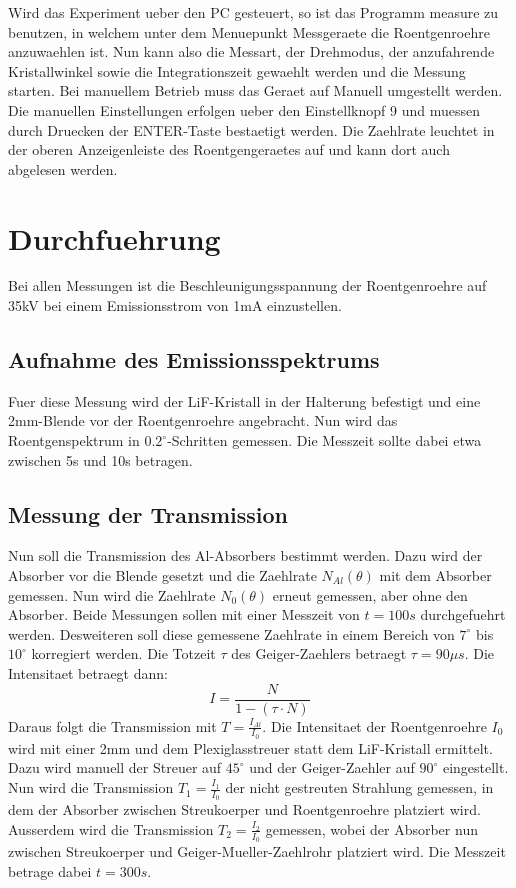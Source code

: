 \noindent Wird das Experiment ueber den PC gesteuert, so ist das Programm measure zu benutzen, in welchem unter dem Menuepunkt Messgeraete die Roentgenroehre anzuwaehlen ist. Nun kann also die Messart, der Drehmodus, der anzufahrende
Kristallwinkel sowie die Integrationszeit gewaehlt werden und die Messung starten. Bei
manuellem Betrieb muss das Geraet auf Manuell umgestellt werden. Die manuellen Einstellungen erfolgen ueber den Einstellknopf
9 und muessen durch Druecken der ENTER-Taste bestaetigt werden. Die Zaehlrate leuchtet in der oberen Anzeigenleiste des Roentgengeraetes auf und kann dort auch abgelesen werden.
\newpage \section{Durchfuehrung}
Bei allen Messungen ist die Beschleunigungsspannung der Roentgenroehre auf 35kV bei einem Emissionsstrom von 1mA einzustellen.
\subsection{Aufnahme des Emissionsspektrums}
Fuer diese Messung wird der LiF-Kristall in der Halterung befestigt und eine 2mm-Blende vor der Roentgenroehre angebracht. Nun wird das Roentgenspektrum in $0.2^{\circ}$-Schritten gemessen. Die Messzeit sollte dabei etwa zwischen 5s und 10s betragen.
\subsection{Messung der Transmission}
Nun soll die Transmission des Al-Absorbers bestimmt werden. Dazu wird der Absorber vor die Blende gesetzt und die Zaehlrate $N_{Al}(\theta)$ mit dem Absorber gemessen. Nun wird die Zaehlrate $N_0(\theta)$ erneut gemessen, aber ohne den Absorber. Beide Messungen sollen mit einer Messzeit von $t=100s$ durchgefuehrt werden. Desweiteren soll diese gemessene Zaehlrate in einem Bereich von $7^{\circ}$ bis $10^{\circ}$ korregiert werden. Die Totzeit $\tau$ des Geiger-Zaehlers betraegt $\tau=90\mu s$. Die Intensitaet betraegt dann:
\begin{equation}
    I=\frac{N}{1-(\tau\cdot N)}
\end{equation}
Daraus folgt die Transmission mit $T=\frac{I_{Al}}{I_0}$.
Die Intensitaet der Roentgenroehre $I_0$ wird mit einer 2mm und dem Plexiglasstreuer statt dem LiF-Kristall ermittelt. Dazu wird manuell der Streuer auf $45^{\circ}$ und der Geiger-Zaehler auf $90^{\circ}$ eingestellt.
Nun wird die Transmission $T_1=\frac{I_1}{I_0}$ der nicht gestreuten Strahlung gemessen, in dem der Absorber zwischen Streukoerper und Roentgenroehre platziert wird. Ausserdem wird die Transmission $T_2=\frac{I_2}{I_0}$ gemessen, wobei der Absorber nun zwischen Streukoerper und Geiger-Mueller-Zaehlrohr platziert wird. Die Messzeit betrage dabei $t=300s$.